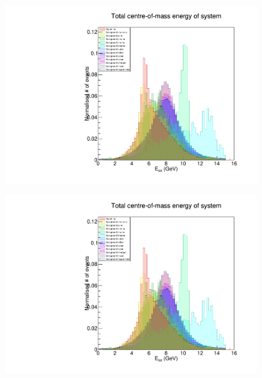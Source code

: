 \documentclass[12pt]{thesis}  %
\begin{document}
\begin{figure}[h]
\centering
\begin{minipage}{.5\textwidth}
  \centering
  \includegraphics[width=\linewidth]{images/stack/stack_cut6_totalCM_E.pdf}
  \label{fig:test1}
\end{minipage}%
\begin{minipage}{.5\textwidth}
  \centering
  \includegraphics[width=\linewidth]{images/stack/stack_cut6_totalCM_E.pdf}
  \label{fig:test2}
\end{minipage}
\end{figure}
\end{document}
